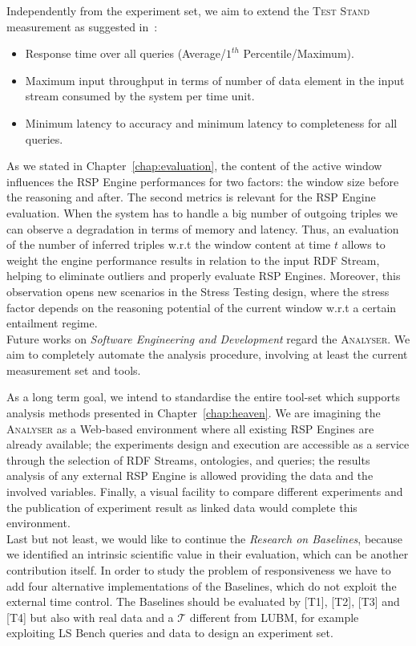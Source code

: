 Independently from the experiment set, we aim to extend the \textsc{Test Stand} measurement as suggested in~\cite{DBLP:conf/esws/ScharrenbachUMVB13}:
\begin{itemize}
\item Response time over all queries (Average/$1^{th}$ Percentile/Maximum).
\item Maximum input throughput in terms of number of data element in the input stream consumed by the system per time unit.
\item Minimum latency to accuracy and minimum latency to completeness for all queries.
\end{itemize}

As we stated in Chapter~\ref{chap:evaluation}, the content of the active window influences the RSP Engine performances for two factors: the window size before the reasoning and after. The second metrics is relevant for the RSP Engine evaluation. When the system has to handle a big number of outgoing triples we can observe a degradation in terms of memory and latency. Thus, an evaluation of the number of inferred triples w.r.t the window content at time $t$ allows to weight the engine performance results in relation to the input RDF Stream, helping to eliminate outliers and properly evaluate RSP Engines. Moreover, this observation opens new scenarios in the Stress Testing design, where the stress factor depends on the reasoning potential of the current window w.r.t a certain entailment regime.\\

\noindent Future works on \textit{Software Engineering and Development} regard the \textsc{Analyser}.  We aim to completely automate the analysis procedure, involving at least the current measurement set and tools. 

As a long term goal, we intend to standardise the entire tool-set which supports analysis methods presented in Chapter~\ref{chap:heaven}. We are imagining the \textsc{Analyser} as a Web-based environment where all existing RSP Engines are already available; the experiments design and execution are accessible as a service through the selection of RDF Streams, ontologies, and queries; the results analysis of any external RSP Engine is allowed providing the data and the involved variables. Finally, a visual facility to compare different experiments and the publication of experiment result as linked data would complete this environment. \\


\noindent Last but not least, we would like to continue the \textit{Research on Baselines}, because we identified an intrinsic scientific value in their evaluation, which can be another contribution itself. In order to study the problem of responsiveness we have to add four alternative implementations of the Baselines, which do not exploit the external time control. The Baselines should be evaluated by [T1], [T2], [T3] and [T4] but also with real data and a $\mathcal{T}$ different from LUBM, for example exploiting LS Bench queries and data to design an experiment set. 

